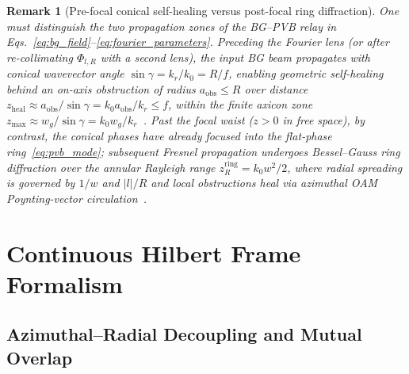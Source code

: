 \documentclass[aps,pra,onecolumn,notitlepage,11pt,tightenlines,amsmath,amssymb,floatfix,longbibliography]{revtex4-2}
\providecommand{\abs}[1]{\lvert#1\rvert}
\newtheorem{remark}{Remark}
\begin{document}
\begin{remark}[Pre-focal conical self-healing versus post-focal ring diffraction]
\label{rem:propagation}
One must distinguish the two propagation zones of the BG--PVB relay in Eqs.~\eqref{eq:bg_field}--\eqref{eq:fourier_parameters}. Preceding the Fourier lens (or after re-collimating $\Phi_{l,R}$ with a second lens), the input BG beam propagates with conical wavevector angle $\sin\gamma = k_r/k_0 = R/f$, enabling geometric self-healing behind an on-axis obstruction of radius $a_{\mathrm{obs}} \le R$ over distance $z_{\mathrm{heal}} \approx a_{\mathrm{obs}}/\sin\gamma = k_0 a_{\mathrm{obs}}/k_r \le f$, within the finite axicon zone $z_{\max} \approx w_g/\sin\gamma = k_0 w_g/k_r$~\cite{Gori1987}. Past the focal waist ($z > 0$ in free space), by contrast, the conical phases have already focused into the flat-phase ring~\eqref{eq:pvb_mode}; subsequent Fresnel propagation undergoes Bessel--Gauss ring diffraction over the annular Rayleigh range $z_R^{\mathrm{ring}} = k_0 w^2/2$, where radial spreading is governed by $1/w$ and $\abs{l}/R$ and local obstructions heal via azimuthal OAM Poynting-vector circulation~\cite{Reddy2016}.
\end{remark}

\section{Continuous Hilbert Frame Formalism}
\label{sec:frame_formalism}

\subsection{Azimuthal--Radial Decoupling and Mutual Overlap}
\label{subsec:overlap_kernel}
\end{document}
